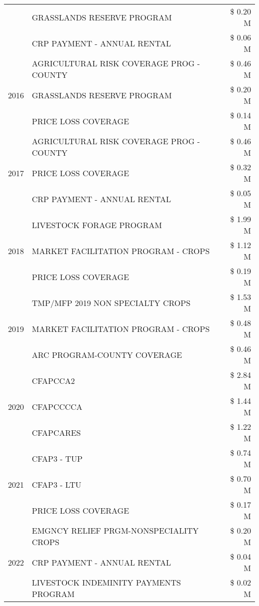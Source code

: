 \begin{tabular}{llr}
 & GRASSLANDS RESERVE PROGRAM & \$ 0.20 M \\
 & CRP PAYMENT - ANNUAL RENTAL & \$ 0.06 M \\
\cline{1-3}
\multirow[t]{3}{*}{2016} & AGRICULTURAL RISK COVERAGE PROG - COUNTY & \$ 0.46 M \\
 & GRASSLANDS RESERVE PROGRAM & \$ 0.20 M \\
 & PRICE LOSS COVERAGE & \$ 0.14 M \\
\cline{1-3}
\multirow[t]{3}{*}{2017} & AGRICULTURAL RISK COVERAGE PROG - COUNTY & \$ 0.46 M \\
 & PRICE LOSS COVERAGE & \$ 0.32 M \\
 & CRP PAYMENT - ANNUAL RENTAL & \$ 0.05 M \\
\cline{1-3}
\multirow[t]{3}{*}{2018} & LIVESTOCK FORAGE PROGRAM & \$ 1.99 M \\
 & MARKET FACILITATION PROGRAM - CROPS & \$ 1.12 M \\
 & PRICE LOSS COVERAGE & \$ 0.19 M \\
\cline{1-3}
\multirow[t]{3}{*}{2019} & TMP/MFP 2019 NON SPECIALTY CROPS & \$ 1.53 M \\
 & MARKET FACILITATION PROGRAM - CROPS & \$ 0.48 M \\
 & ARC PROGRAM-COUNTY COVERAGE & \$ 0.46 M \\
\cline{1-3}
\multirow[t]{3}{*}{2020} & CFAPCCA2 & \$ 2.84 M \\
 & CFAPCCCCA & \$ 1.44 M \\
 & CFAPCARES & \$ 1.22 M \\
\cline{1-3}
\multirow[t]{3}{*}{2021} & CFAP3 - TUP & \$ 0.74 M \\
 & CFAP3 - LTU & \$ 0.70 M \\
 & PRICE LOSS COVERAGE & \$ 0.17 M \\
\cline{1-3}
\multirow[t]{3}{*}{2022} & EMGNCY RELIEF PRGM-NONSPECIALITY CROPS & \$ 0.20 M \\
 & CRP PAYMENT - ANNUAL RENTAL & \$ 0.04 M \\
 & LIVESTOCK INDEMINITY PAYMENTS PROGRAM & \$ 0.02 M \\
\cline{1-3}
\bottomrule
\end{tabular}
